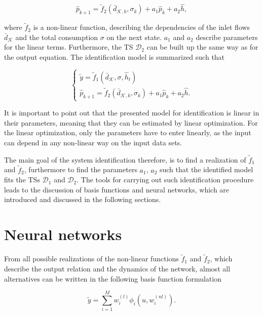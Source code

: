 \begin{equation}
\label{WT_matrixform_final_discrete2}
\hat{p}_{k+1} = \tilde{f}_2(\bar{d}_{\mathcal{K},k}, \sigma_k) + a_1 \hat{p}_k + a_2 \hat{h},
\end{equation}

where $\tilde{f}_2$ is a non-linear function, describing the dependencies of the inlet flows $\bar{d}_{\mathcal{K}}$ and the total consumption $\sigma$ on the next state. $a_1$ and $a_2$ describe parameters for the linear terms. Furthermore, the TS $\mathcal{D}_2$ can be built up the same way as for the output equation. The identification model is summarized such that 

\begin{equation}
\begin{cases}
  \label{identification_model}
    \tilde{y}  = \tilde{f}_1(\bar{d}_{\mathcal{K}}, \sigma, \hat{h}_t )\\
  \hat{p}_{k+1} = \tilde{f}_2(\bar{d}_{\mathcal{K},k}, \sigma_k) + a_1 \hat{p}_k + a_2 \hat{h} .
  \end{cases}
\end{equation} 

It is important to point out that the presented model for identification is linear in their parameters, meaning that they can be estimated by linear optimization. For the linear optimization, only the parameters have to enter linearly, as the input can depend in any non-linear way on the input data sets. 

The main goal of the system identification therefore, is to find a realization of $\tilde{f}_1$ and $\tilde{f}_2$, furthermore to find the parameters $a_1$, $a_2$ such that the identified model fits the TSs $\mathcal{D}_{1}$ and $\mathcal{D}_{2}$. The tools for carrying out such identification procedure leads to the discussion of basis functions and neural networks, which are introduced and discussed in the following sections.   

\section{Neural networks}
\label{neural_networks}

From all possible realizations of the non-linear functions $\tilde{f}_1$ and $\tilde{f}_2$, which describe the output relation and the dynamics of the network, almost all alternatives can be written in the following basis function formulation \cite{norgaard2003neural}

\begin{equation}
\label{basis_NN_eq}
\tilde{y} = \sum_{i = 1}^M w^{(l)}_i \phi_i(u, w^{(nl)}_i).
\end{equation}

